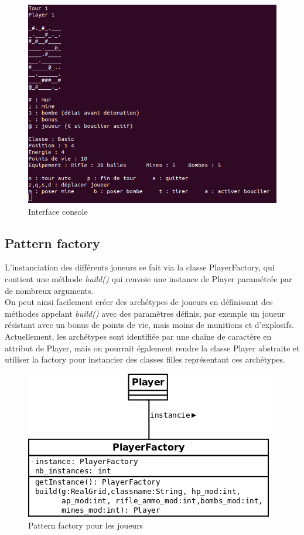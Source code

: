 \documentclass[a4paper,12pt]{article} %
\begin{document}
\begin{figure}[!h]
\centering
\includegraphics[scale=0.5]{images/game.png}
\caption{Interface console}
\end{figure}

\subsection{Pattern factory}

L'instanciation des différents joueurs se fait via la classe PlayerFactory, qui contient une méthode \textit{build()} qui renvoie une instance de Player paramétrée par de nombreux arguments.\\
On peut ainsi facilement créer des archétypes de joueurs en définissant des méthodes appelant \textit{build()} avec des paramètres définis, par exemple un joueur résistant avec un bonus de points de vie, mais moins de munitions et d'explosifs.\\
Actuellement, les archétypes sont identifiée par une chaîne de caractère en attribut de Player, mais on pourrait également rendre la classe Player abstraite et utiliser la factory pour instancier des classes filles représentant ces archétypes.\\

\begin{figure}[!h]
\centering
\includegraphics[scale=0.5]{images/factory.png}
\caption{Pattern factory pour les joueurs}
\end{figure}
\end{document}
